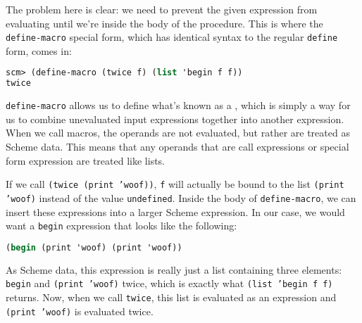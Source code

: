 
The problem here is clear: we need to prevent the given expression from
evaluating until we're inside the body of the procedure. This is where the
\texttt{define-macro} special form, which has identical syntax to the regular
\texttt{define} form, comes in:

\begin{lstlisting}[language=Scheme]
scm> (define-macro (twice f) (list 'begin f f))
twice
\end{lstlisting}

\texttt{define-macro} allows us to define what's known as a ,
which is simply a way for us to combine unevaluated input expressions together
into another expression. When we call macros, the operands are not evaluated,
but rather are treated as Scheme data. This means that any operands that are
call expressions or special form expression are treated like lists.

If we call \texttt{(twice (print 'woof))}, \texttt{f} will actually be bound to
the list \texttt{(print 'woof)} instead of the value \texttt{undefined}.
Inside the body of \texttt{define-macro}, we can insert these expressions into
a larger Scheme expression. In our case, we would want a \texttt{begin}
expression that looks like the following:

\begin{lstlisting}[language=Scheme]
(begin (print 'woof) (print 'woof))
\end{lstlisting}

As Scheme data, this expression is really just a list containing three
elements: \texttt{begin} and \texttt{(print 'woof)} twice, which is exactly
what \texttt{(list 'begin f f)} returns.  Now, when we call \texttt{twice},
this list is evaluated as an expression and \texttt{(print 'woof)} is evaluated
twice.

